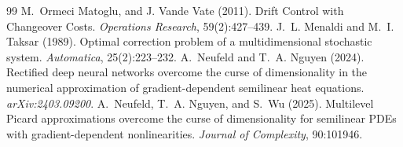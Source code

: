 \documentclass[11pt]{article}
\theoremstyle{definition}
\theoremstyle{plain}
\begin{document}
\begin{singlespace}
\begin{thebibliography}{99}
   M.~Ormeci Matoglu, and J. Vande Vate (2011). \newblock Drift Control with Changeover Costs. \newblock \emph{Operations Research}, 59(2):427--439.
   J.~L. Menaldi and M.~I. Taksar (1989). \newblock Optimal correction problem of a multidimensional stochastic system. 
  \newblock \emph{Automatica}, 25(2):223--232.
A.~Neufeld and T.~A. Nguyen (2024).
\newblock Rectified deep neural networks overcome the curse of dimensionality in the numerical approximation of gradient-dependent semilinear heat equations.
\newblock \emph{arXiv:2403.09200}.
   A.~Neufeld, T.~A. Nguyen, and S.~Wu (2025). \newblock Multilevel Picard approximations overcome the curse of dimensionality for semilinear PDEs with gradient-dependent nonlinearities. \newblock \emph{Journal of Complexity}, 90:101946.


\end{thebibliography}
\end{singlespace}
\end{document}
